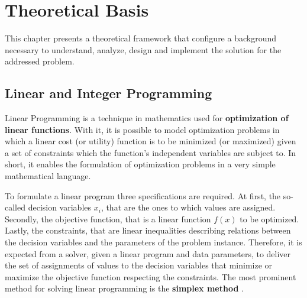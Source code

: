 \documentclass[tuberlin,cic,tc,openright,english,noabntcite,oneside]{iiufrgs}
\begin{document}
\chapter{Theoretical Basis}
This chapter presents a theoretical framework that configure a background necessary to understand, analyze, design and implement the solution for the addressed problem.


\section{Linear and Integer Programming}
Linear Programming is a technique in mathematics used for \textbf{optimization of linear functions}. With it, it is possible to model optimization problems in which a linear cost (or utility) function is to be minimized (or maximized) given a set of constraints which the function's independent variables are subject to. In short, it enables the formulation of optimization problems in a very simple mathematical language.

To formulate a linear program three specifications are required. At first, the so-called decision variables $x_{i}$, that are the ones to which values are assigned. Secondly, the objective function, that is a linear function $f(x)$ to be optimized. Lastly, the constraints, that are linear inequalities describing relations between the decision variables and the parameters of the problem instance. Therefore, it is expected from a solver, given a linear program and data parameters, to deliver the set of assignments of values to the decision variables that minimize or maximize the objective function respecting the constraints. The most prominent method for solving linear programming is the \textbf{simplex method} \parencite[p. 5-6]{shenoy_linear_2007}.
\end{document}
